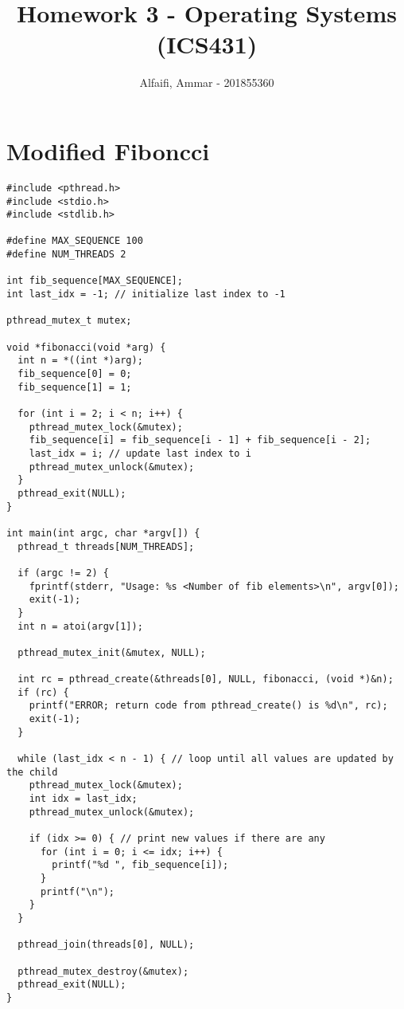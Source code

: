\documentclass{article}
\title{Homework 3 - Operating Systems (ICS431)}
\author{Alfaifi, Ammar - 201855360}
\date{}
\begin{document}
\maketitle

\section{Modified Fiboncci}%

\begin{lstlisting}[style=cstyle]
#include <pthread.h>
#include <stdio.h>
#include <stdlib.h>

#define MAX_SEQUENCE 100
#define NUM_THREADS 2

int fib_sequence[MAX_SEQUENCE];
int last_idx = -1; // initialize last index to -1

pthread_mutex_t mutex;

void *fibonacci(void *arg) {
  int n = *((int *)arg);
  fib_sequence[0] = 0;
  fib_sequence[1] = 1;

  for (int i = 2; i < n; i++) {
    pthread_mutex_lock(&mutex);
    fib_sequence[i] = fib_sequence[i - 1] + fib_sequence[i - 2];
    last_idx = i; // update last index to i
    pthread_mutex_unlock(&mutex);
  }
  pthread_exit(NULL);
}

int main(int argc, char *argv[]) {
  pthread_t threads[NUM_THREADS];

  if (argc != 2) {
    fprintf(stderr, "Usage: %s <Number of fib elements>\n", argv[0]);
    exit(-1);
  }
  int n = atoi(argv[1]);

  pthread_mutex_init(&mutex, NULL);

  int rc = pthread_create(&threads[0], NULL, fibonacci, (void *)&n);
  if (rc) {
    printf("ERROR; return code from pthread_create() is %d\n", rc);
    exit(-1);
  }

  while (last_idx < n - 1) { // loop until all values are updated by the child
    pthread_mutex_lock(&mutex);
    int idx = last_idx;
    pthread_mutex_unlock(&mutex);

    if (idx >= 0) { // print new values if there are any
      for (int i = 0; i <= idx; i++) {
        printf("%d ", fib_sequence[i]);
      }
      printf("\n");
    }
  }

  pthread_join(threads[0], NULL);

  pthread_mutex_destroy(&mutex);
  pthread_exit(NULL);
}
\end{lstlisting}
\end{document}
